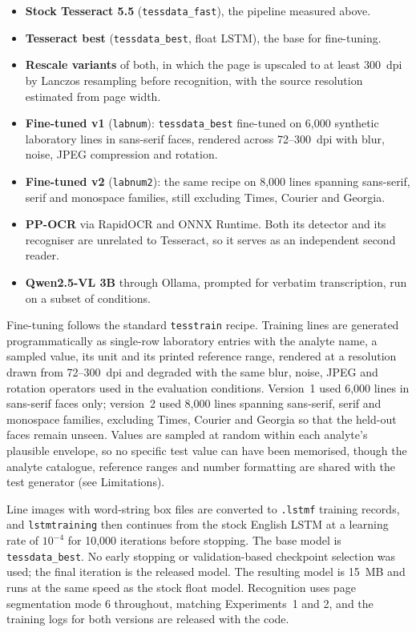 \documentclass[11pt]{article}
\begin{document}
\begin{itemize}
\item \textbf{Stock Tesseract 5.5} (\texttt{tessdata\_fast}), the pipeline measured above.
\item \textbf{Tesseract best} (\texttt{tessdata\_best}, float LSTM), the base for fine-tuning.
\item \textbf{Rescale variants} of both, in which the page is upscaled to at least 300~dpi by
Lanczos resampling before recognition, with the source resolution estimated from page width.
\item \textbf{Fine-tuned v1} (\texttt{labnum}): \texttt{tessdata\_best} fine-tuned on 6{,}000
synthetic laboratory lines in sans-serif faces, rendered across 72--300~dpi with blur, noise,
JPEG compression and rotation.
\item \textbf{Fine-tuned v2} (\texttt{labnum2}): the same recipe on 8{,}000 lines spanning
sans-serif, serif and monospace families, still excluding Times, Courier and Georgia.
\item \textbf{PP-OCR} via RapidOCR and ONNX Runtime. Both its detector and its
recogniser are unrelated to Tesseract, so it serves as an independent second reader.
\item \textbf{Qwen2.5-VL 3B} through Ollama, prompted for verbatim transcription, run on a
subset of conditions.
\end{itemize}

Fine-tuning follows the standard \texttt{tesstrain} recipe. Training lines are generated
programmatically as single-row laboratory entries with the analyte name, a sampled value, its
unit and its printed reference range, rendered at a resolution drawn from 72--300~dpi and
degraded with the same blur, noise, JPEG and rotation operators used in the evaluation
conditions. Version~1 used 6{,}000 lines in sans-serif faces only; version~2 used 8{,}000 lines
spanning sans-serif, serif and monospace families, excluding Times, Courier and Georgia so that
the held-out faces remain unseen. Values are sampled at random within each analyte's plausible
envelope, so no specific test value can have been memorised, though the analyte catalogue,
reference ranges and number formatting are shared with the test generator (see Limitations).

Line images with word-string box files are converted to \texttt{.lstmf} training records, and
\texttt{lstmtraining} then continues from the stock English LSTM at a learning rate of
$10^{-4}$ for 10{,}000 iterations before stopping. The base model is \texttt{tessdata\_best}. No early
stopping or validation-based checkpoint selection was used; the final iteration is the released
model. The resulting model is 15~MB and runs at the same speed as the stock float model.
Recognition uses page segmentation mode 6 throughout, matching Experiments~1 and 2, and the
training logs for both versions are released with the code.
\end{document}
